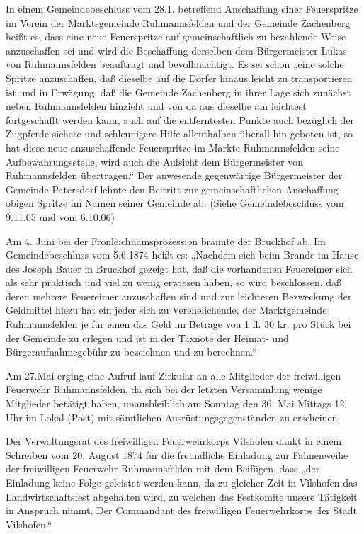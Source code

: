 In einem Gemeindebeschluss vom 28.1. betreffend Anschaffung einer Feuerspritze
im Verein der Marktsgemeinde Ruhmannsfelden und der Gemeinde Zachenberg heißt
es, dass eine neue Feuerspritze auf gemeinschaftlich zu bezahlende Weise
anzuschaffen sei und wird die Beschaffung derselben dem Bürgermeister Lukas von
Ruhmannsfelden beauftragt und bevollmächtigt. Es sei schon „eine solche Spritze
anzuschaffen, daß dieselbe auf die Dörfer hinaus leicht zu transportieren ist
und in Erwägung, daß die Gemeinde Zachenberg in ihrer Lage sich zunächst neben
Ruhmannsfelden hinzieht und von da aus dieselbe am leichtest fortgeschafft
werden kann, auch auf die entferntesten Punkte auch bezüglich der Zugpferde
sichere und schleunigere Hilfe allenthalben überall hin geboten ist, so hat
diese neue anzuschaffende Feuerspritze im Markte Ruhmannsfelden seine
Aufbewahrungsstelle, wird auch die Aufsicht dem Bürgermeister von Ruhmannsfelden
übertragen.“ Der anwesende gegenwärtige Bürgermeister der Gemeinde Patersdorf
lehnte den Beitritt zur gemeinschaftlichen Anschaffung obigen Spritze im Namen
seiner Gemeinde ab. (Siehe Gemeindebeschluss vom 9.11.05 und vom 6.10.06)

Am 4. Juni bei der Fronleichnamsprozession brannte der Bruckhof ab. Im
Gemeindebeschluss vom 5.6.1874 heißt es: „Nachdem sich beim Brande im Hause des
Joseph Bauer in Bruckhof gezeigt hat, daß die vorhandenen Feuereimer sich als
sehr praktisch und viel zu wenig erwiesen haben, so wird beschlossen, daß deren
mehrere Feuereimer anzuschaffen sind und zur leichteren Bezweckung der
Geldmittel hiezu hat ein jeder sich zu Verehelichende, der Marktgemeinde
Ruhmannsfelden je für einen das Geld im Betrage von 1 fl. 30 kr. pro Stück bei
der Gemeinde zu erlegen und ist in der Taxnote der Heimat- und
Bürgeraufnahmegebühr zu bezeichnen und zu berechnen.“

Am 27.Mai erging eine Aufruf lauf Zirkular an alle Mitglieder der freiwilligen
Feuerwehr Ruhmannsfelden, da sich bei der letzten Versammlung wenige Mitglieder
betätigt haben, unausbleiblich am Sonntag den 30. Mai Mittags 12 Uhr im Lokal
(Post) mit sämtlichen Ausrüstungsgegenständen zu erscheinen.

Der Verwaltungsrat des freiwilligen Feuerwehrkorps Vilshofen dankt in einem
Schreiben vom 20. August 1874 für die freundliche Einladung zur Fahnenweihe der
freiwilligen Feuerwehr Ruhmannsfelden mit dem Beifügen, dass „der Einladung
keine Folge geleistet werden kann, da zu gleicher Zeit in Vilshofen das
Landwirtschaftsfest abgehalten wird, zu welchen das Festkomite unsere Tätigkeit
in Anspruch nimmt. Der Commandant des freiwilligen Feuerwehrkorps der Stadt
Vilshofen.“

